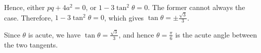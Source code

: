 \begin{enumerate}
          Hence, either \(pq + 4a^2 = 0\), or \(1 - 3 \tan^2 \theta = 0\). The former cannot always the case. Therefore, \(1 - 3 \tan^2 \theta = 0\), which gives \(\tan \theta = \pm \frac{\sqrt{3}}{3}\).

          Since \(\theta\) is acute, we have \(\tan \theta = \frac{\sqrt{3}}{3}\), and hence \(\theta = \frac{\pi}{6}\) is the acute angle between the two tangents.
\end{enumerate}
